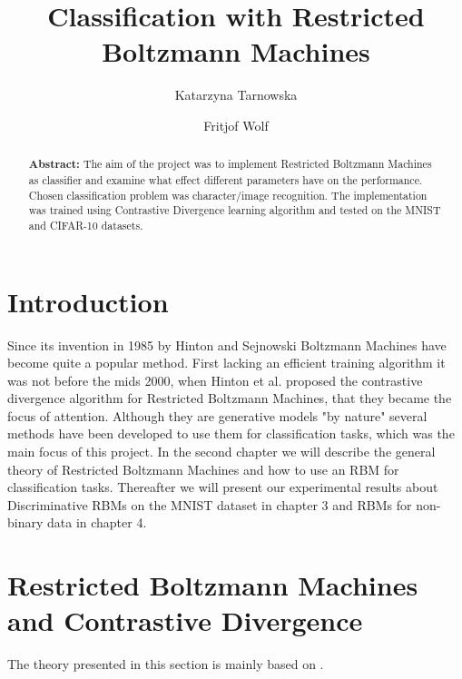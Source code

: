 \documentclass[a4paper]{scrartcl}
\begin{document}
\title{Classification with Restricted Boltzmann Machines}
\author{Katarzyna Tarnowska \and Fritjof Wolf}
\maketitle

\begin{abstract}
\textbf{Abstract:}
The aim of the project was to implement Restricted Boltzmann Machines as classifier and examine what effect different parameters have on the performance. Chosen classification problem was character/image recognition. The implementation was trained using Contrastive Divergence learning algorithm and tested on the MNIST and CIFAR-10 datasets. 
\end{abstract}
\newpage

\section{Introduction}
Since its invention in 1985 by Hinton and Sejnowski Boltzmann Machines have become quite a popular method. First lacking an efficient training algorithm it was not before the mids 2000, when Hinton et al. proposed the contrastive divergence algorithm for Restricted Boltzmann Machines, that they became the focus of attention. Although they are generative models "by nature" several methods have been developed to use them for classification tasks, which was the main focus of this project.
In the second chapter we will describe the general theory of Restricted Boltzmann Machines and how to use an RBM for classification tasks. Thereafter we will present our experimental results about Discriminative RBMs on the MNIST dataset in chapter 3 and RBMs for non-binary data in chapter 4.

\newpage

\section{Restricted Boltzmann Machines and Contrastive Divergence}
The theory presented in this section is mainly based on \cite{Hinton}.
\end{document}
